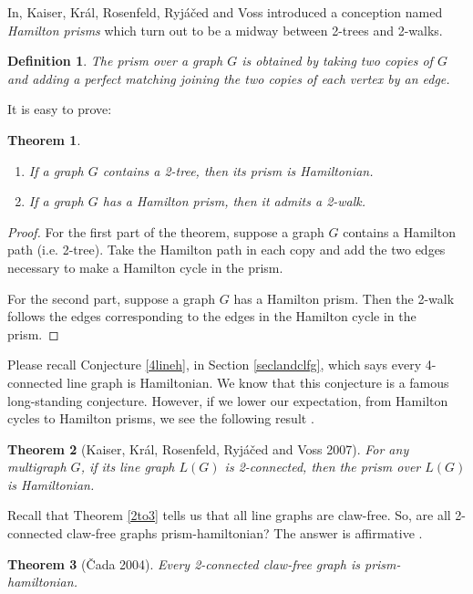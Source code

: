 \documentclass[12pt]{report}
\newtheorem{theorem}{Theorem}
\newtheorem{definition}{Definition}
\begin{document}
In\cite{kaiser2007hamilton}, Kaiser, Kr{\'a}l, Rosenfeld, Ryj{\'a}{\v c}ed and Voss introduced a conception named {\em Hamilton prisms} which turn out to be a midway between 2-trees and 2-walks.
\begin{definition}
The prism over a graph $G$ is obtained by taking two copies of $G$ and adding a perfect matching joining the two copies of each vertex by an edge.
\end{definition}

It is easy to prove:
\begin{theorem}\label{2thp2wthm1}
~

\begin{enumerate}
\item If a graph $G$ contains a 2-tree, then its prism is Hamiltonian.
\item If  a graph $G$ has a Hamilton prism, then it admits a 2-walk.
\end{enumerate}
\end{theorem}

\begin{proof}
For the first part of the theorem, suppose a graph $G$ contains a Hamilton path (i.e. 2-tree). Take the Hamilton path in each copy and add the two edges necessary to make a Hamilton cycle in the prism.

For the second part, suppose a graph $G$ has a Hamilton prism. Then the 2-walk follows the edges corresponding to the edges in the Hamilton cycle in the prism.
\end{proof}


Please recall Conjecture \ref{4lineh}, in Section \ref{seclandclfg}, which says every 4-connected line graph is Hamiltonian. We know that this conjecture is a famous long-standing conjecture. However, if we lower our expectation, from Hamilton cycles to Hamilton prisms, we see the following result \cite{kaiser2007hamilton}.


\begin{theorem}[Kaiser, Kr{\'a}l, Rosenfeld, Ryj{\'a}{\v c}ed and Voss 2007]\label{2clhpthm1}
For any multigraph $G$, if its line graph $L(G)$ is 2-connected, then the prism over $L(G)$ is Hamiltonian.
\end{theorem}

Recall that Theorem \ref{2to3} tells us that all line graphs are claw-free. So, are all 2-connected claw-free graphs prism-hamiltonian? The answer is affirmative \cite{vcada2004hamiltonian}.


\begin{theorem}[{\v C}ada 2004]\label{2cclwfgphth}
Every 2-connected claw-free graph is prism-hamiltonian.
\end{theorem}
\end{document}

